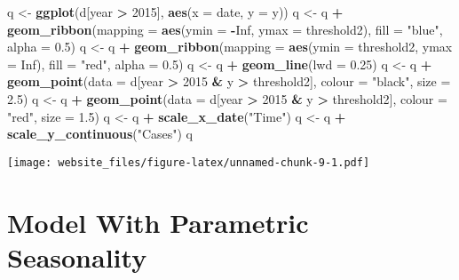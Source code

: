 \documentclass[]{book}
\newenvironment{Shaded}{\begin{snugshade}}{\end{snugshade}}
\newcommand{\KeywordTok}[1]{\textcolor[rgb]{0.13,0.29,0.53}{\textbf{#1}}}
\newcommand{\DataTypeTok}[1]{\textcolor[rgb]{0.13,0.29,0.53}{#1}}
\newcommand{\DecValTok}[1]{\textcolor[rgb]{0.00,0.00,0.81}{#1}}
\newcommand{\FloatTok}[1]{\textcolor[rgb]{0.00,0.00,0.81}{#1}}
\newcommand{\StringTok}[1]{\textcolor[rgb]{0.31,0.60,0.02}{#1}}
\newcommand{\OtherTok}[1]{\textcolor[rgb]{0.56,0.35,0.01}{#1}}
\newcommand{\OperatorTok}[1]{\textcolor[rgb]{0.81,0.36,0.00}{\textbf{#1}}}
\newcommand{\NormalTok}[1]{#1}
\begin{document}
\begin{Shaded}
\begin{Highlighting}[]
\NormalTok{q <-}\StringTok{ }\KeywordTok{ggplot}\NormalTok{(d[year }\OperatorTok{>}\StringTok{ }\DecValTok{2015}\NormalTok{], }\KeywordTok{aes}\NormalTok{(}\DataTypeTok{x =}\NormalTok{ date, }\DataTypeTok{y =}\NormalTok{ y))}
\NormalTok{q <-}\StringTok{ }\NormalTok{q }\OperatorTok{+}\StringTok{ }\KeywordTok{geom_ribbon}\NormalTok{(}\DataTypeTok{mapping =} \KeywordTok{aes}\NormalTok{(}\DataTypeTok{ymin =} \OperatorTok{-}\OtherTok{Inf}\NormalTok{, }\DataTypeTok{ymax =}\NormalTok{ threshold2), }\DataTypeTok{fill =} \StringTok{"blue"}\NormalTok{, }\DataTypeTok{alpha =} \FloatTok{0.5}\NormalTok{)}
\NormalTok{q <-}\StringTok{ }\NormalTok{q }\OperatorTok{+}\StringTok{ }\KeywordTok{geom_ribbon}\NormalTok{(}\DataTypeTok{mapping =} \KeywordTok{aes}\NormalTok{(}\DataTypeTok{ymin =}\NormalTok{ threshold2, }\DataTypeTok{ymax =} \OtherTok{Inf}\NormalTok{), }\DataTypeTok{fill =} \StringTok{"red"}\NormalTok{, }\DataTypeTok{alpha =} \FloatTok{0.5}\NormalTok{)}
\NormalTok{q <-}\StringTok{ }\NormalTok{q }\OperatorTok{+}\StringTok{ }\KeywordTok{geom_line}\NormalTok{(}\DataTypeTok{lwd =} \FloatTok{0.25}\NormalTok{)}
\NormalTok{q <-}\StringTok{ }\NormalTok{q }\OperatorTok{+}\StringTok{ }\KeywordTok{geom_point}\NormalTok{(}\DataTypeTok{data =}\NormalTok{ d[year }\OperatorTok{>}\StringTok{ }\DecValTok{2015} \OperatorTok{&}\StringTok{ }\NormalTok{y }\OperatorTok{>}\StringTok{ }\NormalTok{threshold2], }\DataTypeTok{colour =} \StringTok{"black"}\NormalTok{, }\DataTypeTok{size =} \FloatTok{2.5}\NormalTok{)}
\NormalTok{q <-}\StringTok{ }\NormalTok{q }\OperatorTok{+}\StringTok{ }\KeywordTok{geom_point}\NormalTok{(}\DataTypeTok{data =}\NormalTok{ d[year }\OperatorTok{>}\StringTok{ }\DecValTok{2015} \OperatorTok{&}\StringTok{ }\NormalTok{y }\OperatorTok{>}\StringTok{ }\NormalTok{threshold2], }\DataTypeTok{colour =} \StringTok{"red"}\NormalTok{, }\DataTypeTok{size =} \FloatTok{1.5}\NormalTok{)}
\NormalTok{q <-}\StringTok{ }\NormalTok{q }\OperatorTok{+}\StringTok{ }\KeywordTok{scale_x_date}\NormalTok{(}\StringTok{"Time"}\NormalTok{)}
\NormalTok{q <-}\StringTok{ }\NormalTok{q }\OperatorTok{+}\StringTok{ }\KeywordTok{scale_y_continuous}\NormalTok{(}\StringTok{"Cases"}\NormalTok{)}
\NormalTok{q}
\end{Highlighting}
\end{Shaded}

\texttt{[image: website\_files/figure-latex/unnamed-chunk-9-1.pdf]}

\section{Model With Parametric
Seasonality}\label{model-with-parametric-seasonality}
\end{document}
